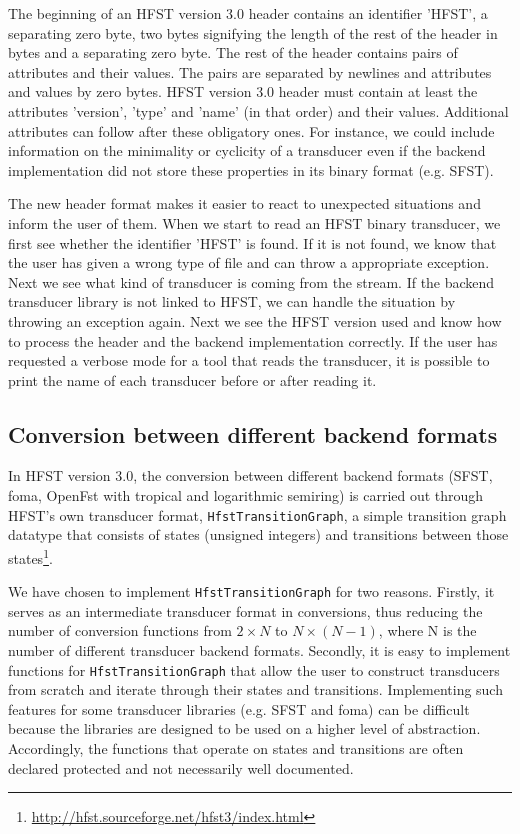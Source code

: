 \documentclass{llncs}
\begin{document}
The beginning of an HFST version 3.0 header contains an identifier
'HFST', a separating zero byte, two bytes signifying the length of
the rest of the header in bytes and a separating zero byte. The rest
of the header contains pairs of attributes and their values. The pairs
are separated by newlines and attributes and values by zero bytes. 
HFST version 3.0 header must contain at least the attributes
'version', 'type' and 'name' (in that order) and their values. 
Additional attributes can follow after these obligatory ones. 
For instance, we could include information on the minimality or
cyclicity of a transducer even if the backend implementation did not
store these properties in its binary format (e.g. SFST). 

The new header format makes it easier to react to unexpected
situations and inform the user of them. When we start to read an HFST
binary transducer, we first see whether the identifier 'HFST' is
found. If it is not found, we know that the user has given a wrong
type of file and can throw a appropriate exception. 
Next we see what kind of transducer is coming from the stream. 
If the backend transducer library is not linked to HFST, we can handle
the situation by throwing an exception again. 
Next we see the HFST version used and know how to process the header
and the backend implementation correctly. 
If the user has requested a verbose mode for a tool that reads the
transducer, it is possible to print the name of each transducer 
before or after reading it.

\subsection{Conversion between different backend formats}

In HFST version 3.0, the conversion between different backend formats 
(SFST, foma, OpenFst with tropical and logarithmic semiring) is
carried out through HFST's own transducer format, \texttt{HfstTransitionGraph}, 
a simple transition graph datatype that consists of states (unsigned
integers) and transitions between those 
states\footnote{\url{http://hfst.sourceforge.net/hfst3/index.html}}.
 
We have chosen to implement \texttt{HfstTransitionGraph} for two
reasons. Firstly, it serves as an intermediate transducer format in
conversions, thus reducing the number of conversion functions from
$2 \times N$ to $N \times (N - 1)$, where N is the number of different
transducer backend formats. Secondly, it is easy to implement functions for 
\texttt{HfstTransitionGraph} that allow the user to construct transducers from 
scratch and iterate through their states and transitions. Implementing
such features for some transducer libraries (e.g. SFST and foma) can
be difficult because the libraries are designed to be used on a higher level of 
abstraction. Accordingly, the functions that operate on states and 
transitions are often declared protected and not necessarily well
documented.
\end{document}
